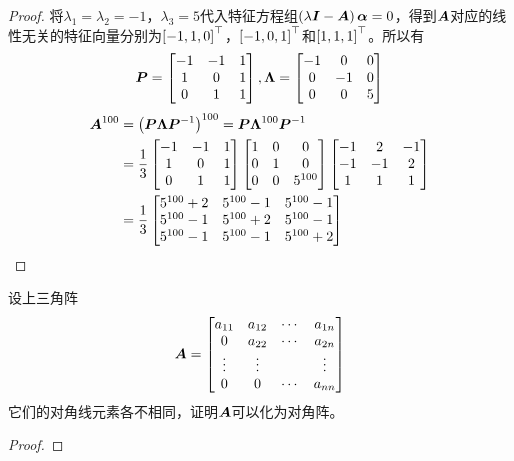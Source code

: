 \begin{proof}
    将\(\lambda_1=\lambda_2=-1\)，\(\lambda_3=5\)代入特征方程组\(\left( \lambda\boldsymbol{I}-\boldsymbol{A} \right)\boldsymbol{\alpha}=0\)，得到\(\boldsymbol{A}\)对应的线性无关的特征向量分别为\(\left[ -1,1,0 \right]^\top\)，\(\left[ -1,0,1 \right]^\top\)和\(\left[ 1,1,1 \right]^\top\)。所以有
    \begin{equation*}
        \boldsymbol{P}=\begin{bmatrix}-1&-1&1\\1&0&1\\0&1&1\end{bmatrix},\boldsymbol{\Lambda}=\begin{bmatrix}-1&0&0\\0&-1&0\\0&0&5\end{bmatrix}
    \end{equation*}
    \begin{align*}
        \boldsymbol{A}^{100} & =\left( \boldsymbol{P}\boldsymbol{\Lambda}{\boldsymbol{P}}^{-1} \right)^{100}=\boldsymbol{P}\boldsymbol{\Lambda}^{100}{\boldsymbol{P}}^{-1}                                                                                                   \\
                    & =\frac{1}{3}\begin{bmatrix}-1&-1&1\\1&0&1\\0&1&1\end{bmatrix}\begin{bmatrix}1&0&0\\0&1&0\\0&0&5^{100}\end{bmatrix}\begin{bmatrix}-1&2&-1\\-1&-1&2\\1&1&1\end{bmatrix} \\
                    & =\frac{1}{3}\begin{bmatrix}5^{100}+2&5^{100}-1&5^{100}-1\\5^{100}-1&5^{100}+2&5^{100}-1\\5^{100}-1&5^{100}-1&5^{100}+2\end{bmatrix}
    \end{align*}
\end{proof}

\begin{problem}
设上三角阵
\begin{equation*}
    \boldsymbol{A}=
    \begin{bmatrix}
        a_{11} & a_{12} & \cdots & a_{1n} \\
        0      & a_{22} & \cdots & a_{2n} \\
        \vdots & \vdots &        & \vdots \\
        0      & 0      & \cdots & a_{nn}
    \end{bmatrix}
\end{equation*}
它们的对角线元素各不相同，证明\(\boldsymbol{A}\)可以化为对角阵。
\end{problem}
\begin{proof}
\end{proof}

